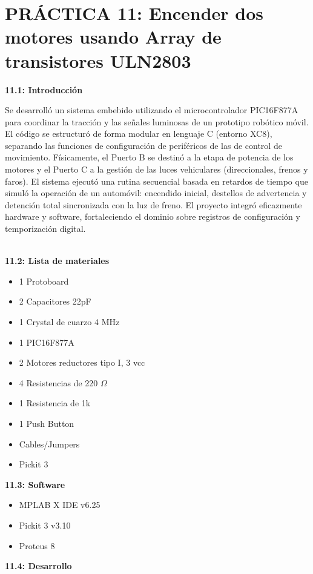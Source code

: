 \section*{\textbf{PRÁCTICA 11: Encender dos motores usando Array de transistores ULN2803}}
\textbf{11.1: Introducción}

Se desarrolló un sistema embebido utilizando el microcontrolador PIC16F877A para coordinar la tracción y las señales luminosas de un prototipo robótico móvil. El código se estructuró de forma modular en lenguaje C (entorno XC8), separando las funciones de configuración de periféricos de las de control de movimiento. Físicamente, el Puerto B se destinó a la etapa de potencia de los motores y el Puerto C a la gestión de las luces vehiculares (direccionales, frenos y faros). El sistema ejecutó una rutina secuencial basada en retardos de tiempo que simuló la operación de un automóvil: encendido inicial, destellos de advertencia y detención total sincronizada con la luz de freno. El proyecto integró eficazmente hardware y software, fortaleciendo el dominio sobre registros de configuración y temporización digital. \\\

\textbf{11.2: Lista de materiales}
\begin{itemize}
    \item 1 Protoboard
    \item 2 Capacitores 22pF
    \item 1 Crystal de cuarzo 4 MHz
    \item 1 PIC16F877A
    \item 2 Motores reductores tipo I, 3 vcc
    \item 4 Resistencias de 220 $\Omega$
    \item 1 Resistencia de 1k
    \item 1 Push Button
    \item Cables/Jumpers
    \item Pickit 3

\end{itemize}
\textbf{11.3: Software}
\begin{itemize}
    \item MPLAB X IDE v6.25
    \item Pickit 3 v3.10
    \item Proteus 8
\end{itemize}
\textbf{11.4: Desarrollo}

